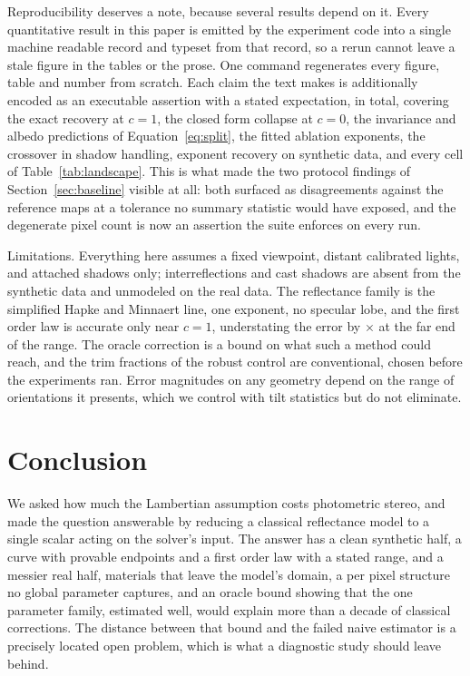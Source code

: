 \documentclass[10pt,twocolumn,letterpaper]{article}
\begin{document}
Reproducibility deserves a note, because several results depend on it. Every
quantitative result in this paper is emitted by the experiment code into a
single machine readable record and typeset from that record, so a rerun cannot
leave a stale figure in the tables or the prose. One command regenerates
every figure, table and number from scratch. Each claim the text makes is
additionally encoded as an executable assertion with a stated expectation,
\numTests{} in total, covering the exact recovery at $c = 1$, the closed form
collapse at $c = 0$, the invariance and albedo predictions of
Equation~\eqref{eq:split}, the fitted ablation exponents, the crossover in
shadow handling, exponent recovery on synthetic data, and every cell of
Table~\ref{tab:landscape}. This is what made the two protocol findings of
Section~\ref{sec:baseline} visible at all: both surfaced as disagreements
against the reference maps at a tolerance no summary statistic would have
exposed, and the degenerate pixel count is now an assertion the suite enforces
on every run.

Limitations. Everything here assumes a fixed viewpoint, distant calibrated
lights, and attached shadows only; interreflections and cast shadows are
absent from the synthetic data and unmodeled on the real data. The reflectance
family is the simplified Hapke and Minnaert line, one exponent, no specular
lobe, and the first order law is accurate only near $c = 1$, understating the
error by \predRatioZero$\times$ at the far end of the range. The oracle
correction is a bound on what such a method could reach, and the trim
fractions of the robust control are conventional, chosen before the
experiments ran. Error magnitudes on any geometry depend on the range of
orientations it presents, which we control with tilt statistics but do not
eliminate.

\section{Conclusion}

We asked how much the Lambertian assumption costs photometric stereo, and made
the question answerable by reducing a classical reflectance model to a single
scalar acting on the solver's input. The answer has a clean synthetic half,
a curve with provable endpoints and a first order law with a stated range, and
a messier real half, materials that leave the model's domain, a per pixel
structure no global parameter captures, and an oracle bound showing that the
one parameter family, estimated well, would explain more than a decade of
classical corrections. The distance between that bound and the failed naive
estimator is a precisely located open problem, which is what a diagnostic
study should leave behind.

{
    \small
                                       {}
    
}
\end{document}
